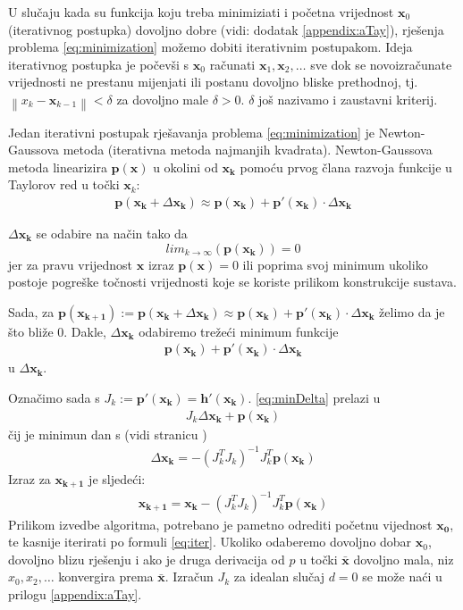\documentclass[a4paper,twoside,12pt]{memoir} %
\begin{document}
U slučaju kada su funkcija koju treba minimiziati i početna vrijednost $\mathbf{x}_0$
(iterativnog postupka) dovoljno dobre (vidi: dodatak \ref{appendix:aTay}), rješenja problema \ref{eq:minimization} možemo
dobiti iterativnim postupakom.
Ideja iterativnog postupka je počevši s $\mathbf{x}_0$ računati $\mathbf{x}_1, \mathbf{x}_2, \hdots $ sve dok se novoizračunate vrijednosti ne prestanu mijenjati ili postanu dovoljno bliske prethodnoj, tj.
$\left \| x_{k} - \mathbf{x}_{k-1}\right\| < \delta$ za dovoljno male $\delta > 0$.
$\delta$ još nazivamo i zaustavni kriterij.

Jedan iterativni postupak rješavanja problema \ref{eq:minimization} je Newton-Gaussova metoda (iterativna metoda najmanjih kvadrata).
Newton-Gaussova metoda linearizira $\mathbf{p}(\mathbf{x})$ u okolini od $\mathbf{x_k}$ pomoću prvog člana razvoja funkcije u Taylorov red\label{stranica:NGLin} u točki $\mathbf{x}_k$:
\begin{align}\label{eq:approx}
	\mathbf{p}(\mathbf{x_k}+ \Delta \mathbf{x_k}) \approx \mathbf{p}(\mathbf{x_k}) + \mathbf{p}'(\mathbf{ x_k})\cdot \Delta \mathbf{x_k}
\end{align}

$\Delta \mathbf{x_k}$ se odabire na način tako da
$$lim_{k \to \infty} \left( \mathbf{p}(\mathbf{x_k}) \right) = 0$$ 
jer za pravu vrijednost $\mathbf{x}$ izraz $\mathbf{p}(\mathbf{x}) = 0$ ili poprima svoj minimum ukoliko postoje pogreške
točnosti vrijednosti koje se koriste prilikom konstrukcije sustava.
 
Sada, za $\mathbf{p}(\mathbf{x_{k+1}}) := \mathbf{p}(\mathbf{x_k}+ \Delta \mathbf{x_k}) \approx \mathbf{p}(\mathbf{x_k}) + \mathbf{p}'(\mathbf{x_k})\cdot \Delta \mathbf{x_k}$ želimo
 da je što bliže 0.
 Dakle, $ \Delta \mathbf{x_k} $ odabiremo trežeći minimum funkcije
\begin{align}\label{eq:minDelta}
	\mathbf{p}(\mathbf{x_k}) + \mathbf{p}'(\mathbf{x_k})\cdot \Delta \mathbf{x_k}
\end{align}
u $\Delta \mathbf{x_k}$.

Označimo sada s $J_k := \mathbf{p}'(\mathbf{x_k}) = \mathbf{h}'(\mathbf{x_k})$.
\ref{eq:minDelta} prelazi u 
\begin{align}\label{eq:minDelta2}
	J_k \Delta \mathbf{x_k} +\mathbf{p}(\mathbf{x_k})
\end{align}
čij je minimun dan s (vidi stranicu \pageref{stranica:nastavakLS})  
\begin{align}\label{eq:minDeltaRj}
\Delta \mathbf{x_k} = - (J_k^TJ_k)^{-1}J_k^T \mathbf{p}(\mathbf{x_k})
\end{align}
Izraz za $\mathbf{x_{k+1}}$ je sljedeći:
\begin{align}\label{eq:iter}
	\mathbf{x_{k+1}} = \mathbf{x_{k}} - (J_k^TJ_k)^{-1}J_k^T \mathbf{p}(\mathbf{x_k})
\end{align}
Prilikom izvedbe algoritma, potrebano je pametno odrediti početnu vijednost $\mathbf{x_0}$, te kasnije iterirati po formuli \ref{eq:iter}.
Ukoliko odaberemo dovoljno dobar $\mathbf{x}_0$, dovoljno blizu rješenju i
ako je druga derivacija od $p$ u točki $\bar{\mathbf{x}}$ dovoljno mala,
niz $x_0,x_2, \hdots$ konvergira prema $\bar{\mathbf{x}}$. Izračun $J_k$ za idealan slučaj $d = 0$ se može naći u prilogu \ref{appendix:aTay}.
\end{document}
